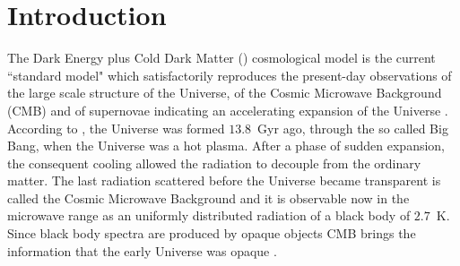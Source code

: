 
\chapter{Introduction}
\label{ch:introduction}

The Dark Energy plus Cold Dark Matter (\lcdm{}) cosmological model is the current ``standard model" which satisfactorily reproduces the present-day observations of the large scale structure of the Universe, of the Cosmic Microwave Background (CMB) and of supernovae indicating an accelerating expansion of the Universe \citep{Riess1998}.
According to \lcdm{}, the Universe was formed $13.8$~Gyr ago, through the so called Big Bang, when the Universe was a hot plasma.
After a phase of sudden expansion, the consequent cooling allowed the radiation to decouple from the ordinary matter.
The last radiation scattered before the Universe became transparent is called the Cosmic Microwave Background and it is observable now in the microwave range as an uniformly distributed radiation of a black body of $2.7$~K.
Since black body spectra are produced by opaque objects CMB brings the information that the early Universe was opaque \citep{Ryden2003}.

